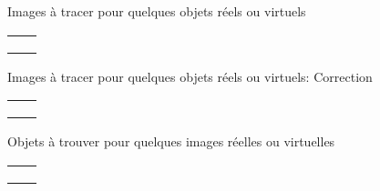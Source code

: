 \documentclass{article}
\newcommand{\titre}[1]{\hfil{\Large #1}}
\begin{document}
\setcounter{page}{1}
\titre{Images \`a tracer pour quelques objets r\'eels ou virtuels}
\begin{tabular}{|c|c|}
\hline
&\\ \hline
&\\ \hline
&\\ \hline
&\\ \hline
\end{tabular}


\newpage


\titre{Images \`a tracer pour quelques objets r\'eels ou virtuels: Correction}
\begin{tabular}{|c|c|}
\hline
&\\ \hline
&\\ \hline
&\\ \hline
&\\ \hline
\end{tabular}


\newpage

\titre{Objets \`a trouver pour quelques images r\'eelles ou virtuelles}
\begin{tabular}{|c|c|}
\hline
&\\ \hline
&\\ \hline
&\\ \hline
&\\ \hline
\end{tabular}


\newpage
\end{document}
